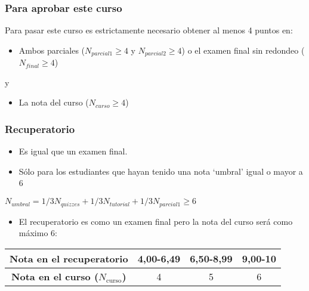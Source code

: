 \documentclass{beamer}
\begin{document}
\begin{frame}
    \frametitle{Para aprobar este curso}
    Para pasar este curso es estrictamente necesario obtener al menos 4 puntos en: \vspace{2mm}
    \begin{itemize}
        \item Ambos parciales ($N_{parcial 1} \geq 4$ y $N_{parcial 2} \geq 4$) o el examen final sin redondeo ($N_{final} \geq 4$)
    \end{itemize}
    \centering y \vspace{2mm}
    \begin{itemize}
        \item La nota del curso ($N_{curso} \geq 4$)
    \end{itemize}
\end{frame}

\begin{frame}
    \frametitle{Recuperatorio}
    \begin{itemize}
        \item Es igual que un examen final. \vspace{2mm}
        \item Sólo para los estudiantes que hayan tenido una nota ‘umbral’ igual o mayor a 6
    \end{itemize}
    \begin{center}
     $N_{umbral}=1/3N_{quizzes}+1/3N_{tutorial}+1/3N_{parcial 1} \geq 6$   
    \end{center}
    \begin{itemize} \vspace{2mm}
        \item El recuperatorio es como un examen final pero la nota del curso será como máximo 6: \vspace{2mm}
    \end{itemize}
    \begin{table}[h]
    \centering
    \renewcommand{\arraystretch}{1.3} 
    \setlength{\arrayrulewidth}{0.7pt} 
    \begin{tabular}{|c|c|c|c|}
        \hline
        \textbf{Nota en el recuperatorio} & 4,00-6,49 & 6,50-8,99 & 9,00-10 \\ 
        \hline
        \textbf{Nota en el curso ($N_{\text{curso}}$)} & 4 & 5 & 6 \\ 
        \hline
    \end{tabular}
\end{table}
\end{frame}
\end{document}
